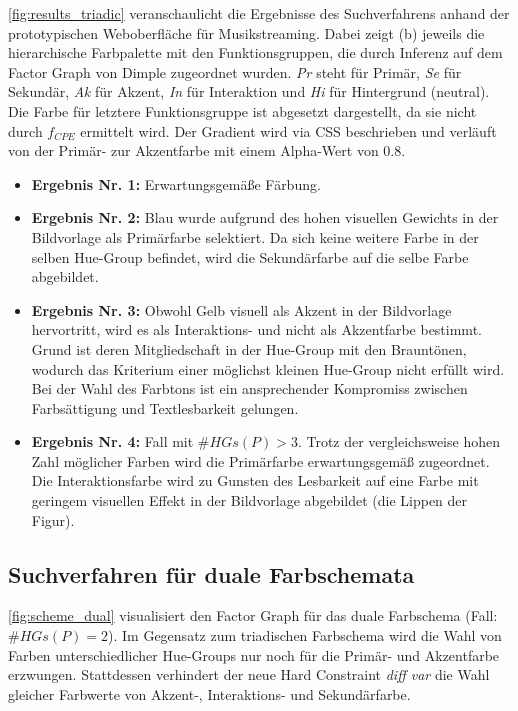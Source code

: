 \autoref{fig:results_triadic} veranschaulicht die Ergebnisse des Suchverfahrens anhand der prototypischen Weboberfläche für Musikstreaming. Dabei zeigt (b) jeweils die hierarchische Farbpalette mit den Funktionsgruppen, die durch Inferenz auf dem Factor Graph von Dimple zugeordnet wurden. \emph{Pr} steht für Primär, \emph{Se} für Sekundär, \emph{Ak} für Akzent, \emph{In} für Interaktion und \emph{Hi} für Hintergrund (neutral). Die Farbe für letztere Funktionsgruppe ist abgesetzt dargestellt, da sie nicht durch $f_{CPE}$ ermittelt wird. Der Gradient wird via CSS beschrieben und verläuft von der Primär- zur Akzentfarbe mit einem Alpha-Wert von 0.8.

\begin{itemize}
	\item \textbf{Ergebnis Nr. 1:} Erwartungsgemäße Färbung.
	\item \textbf{Ergebnis Nr. 2:} Blau wurde aufgrund des hohen visuellen Gewichts in der Bildvorlage als Primärfarbe selektiert. Da sich keine weitere Farbe in der selben Hue-Group befindet, wird die Sekundärfarbe auf die selbe Farbe abgebildet.
	 \item \textbf{Ergebnis Nr. 3:} Obwohl Gelb visuell  als Akzent in der Bildvorlage hervortritt, wird es als Interaktions- und nicht als Akzentfarbe bestimmt. Grund ist deren Mitgliedschaft in der Hue-Group mit den Brauntönen, wodurch das Kriterium einer möglichst kleinen Hue-Group nicht erfüllt wird. Bei der Wahl des Farbtons ist ein ansprechender Kompromiss zwischen Farbsättigung und Textlesbarkeit gelungen.
	 \item \textbf{Ergebnis Nr. 4:} Fall mit $\#HGs(P) > 3$. Trotz der vergleichsweise hohen Zahl möglicher Farben wird die Primärfarbe erwartungsgemäß zugeordnet. Die Interaktionsfarbe wird zu Gunsten des Lesbarkeit auf eine Farbe mit geringem visuellen Effekt in der Bildvorlage abgebildet (die Lippen der Figur).
\end{itemize}

\subsection{Suchverfahren für duale Farbschemata}

\autoref{fig:scheme_dual} visualisiert den Factor Graph für das duale Farbschema (Fall: $\#HGs(P) = 2$). Im Gegensatz zum triadischen Farbschema wird die Wahl von Farben unterschiedlicher Hue-Groups nur noch für die Primär- und Akzentfarbe erzwungen. Stattdessen verhindert der neue Hard Constraint \emph{diff var} die Wahl gleicher Farbwerte von Akzent-, Interaktions- und Sekundärfarbe.
 
